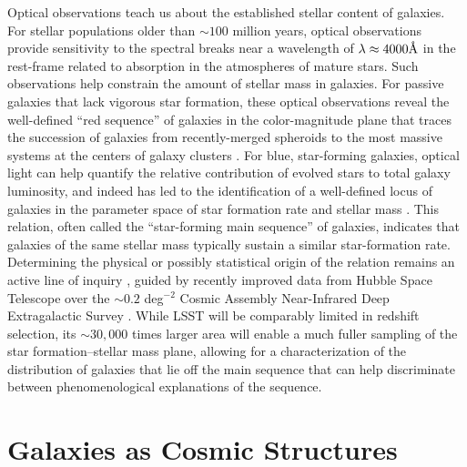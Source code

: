 {Optical observations teach us about
the established stellar content of galaxies.  
For stellar populations older than $\sim100$ million
years, optical observations provide 
sensitivity to the spectral breaks near a
wavelength of $\lambda\approx4000\mbox{\normalfont\AA}$ in the 
rest-frame related to absorption in the
atmospheres of mature stars. 
Such observations help constrain
the amount of stellar mass in galaxies. For
passive galaxies that lack vigorous star formation,
these optical observations reveal
the well-defined ``red sequence'' of
galaxies in the color-magnitude plane
that traces the succession of
galaxies from recently-merged spheroids
to the most massive systems at the
centers of galaxy clusters \citep[e.g.][]{kaviraj2005a}. For blue,
star-forming
galaxies, optical light can help
quantify the relative contribution of
evolved stars to total galaxy luminosity, 
and indeed has
led to the identification of a well-defined
locus of galaxies in the parameter space of
star formation rate and stellar mass 
\citep[e.g.,][]{noeske2007a}. This
relation, often called the ``star-forming
main sequence'' of galaxies, indicates that
galaxies of the same stellar mass typically
sustain a similar star-formation rate. 
Determining the
physical or possibly statistical 
origin of the relation remains an active
line of inquiry \citep[e.g.][]{lofthouse2017a}, guided by recently improved
data from Hubble Space Telescope over the
$\sim0.2$ deg$^{-2}$ Cosmic Assembly Near-Infrared
Deep Extragalactic Survey 
\citep{grogin2011a,koekemoer2011a}. While 
LSST will be comparably limited in redshift 
selection, its $\sim30,000$ times larger area
will enable a much fuller sampling of the
star formation--stellar mass plane, allowing
for a characterization of the distribution
of galaxies that lie off the main sequence
that can help discriminate between phenomenological
explanations of the sequence.

\section{Galaxies as Cosmic Structures}
\label{sec:sci:gal:bkgnd:structures}

}
